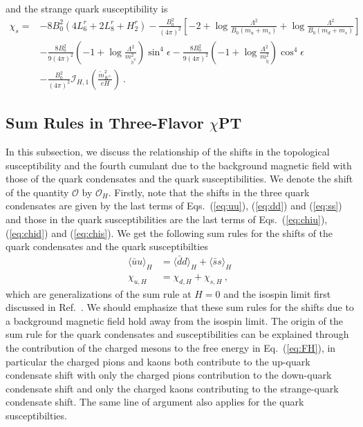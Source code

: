 \documentclass[12pt]{elsarticle}
\begin{document}
and the strange quark susceptibility is
\begin{equation}
\begin{split}
\label{eq:chis}
\chi_{s}=&-8B_{0}^{2}(4L^{r}_{6}+2L^{r}_{8}+H^{r}_{2})-\frac{B_{0}^{2}}{(4\pi)^{2}}\left[-2+\log\frac{\Lambda^{2}}{B_{0}(m_{u}+m_{s})}+\log\frac{\Lambda^{2}}{B_{0}(m_{d}+m_{s})}\right]\\
&-\frac{8B_{0}^{2}}{9(4\pi)^{2}}\left(-1+\log\frac{\Lambda^{2}}{m_{\tilde{\pi}^{0}}^{2}}\right)\sin^{4}\epsilon-\frac{8B_{0}^{2}}{9(4\pi)^{2}}\left(-1+\log\frac{\Lambda^{2}}{m_{\tilde{\eta}}^{2}}\right)\cos^{4}\epsilon\\
&-\frac{B_{0}^{2}}{(4\pi)^{2}}\mathcal{I}_{H,1}(\tfrac{\mathring{m}^{2}_{K^{\pm}}}{eH})\ .
\end{split}
\end{equation}
\subsection{Sum Rules in Three-Flavor $\chi$PT}
\label{sec:sumrules}
In this subsection, we discuss the relationship of the shifts in the topological susceptibility and the fourth cumulant due to the background magnetic field with those of the quark condensates and the quark susceptibilities. We denote the shift of the quantity $\mathcal{O}$ by $\mathcal{O}_{H}$. Firstly, note that the shifts in the three quark condensates are given by the last terms of Eqs.~(\ref{eq:uu}), (\ref{eq:dd}) and (\ref{eq:ss}) and those in the quark susceptibilities are the last terms of Eqs.~(\ref{eq:chiu}), (\ref{eq:chid}) and (\ref{eq:chis}). We get the following sum rules for the shifts of the quark condensates and the quark susceptibilties
\begin{align}
\label{eq:sumrule-qq}
\langle\bar{u}u\rangle_{H}&=\langle\bar{d}d\rangle_{H}+\langle\bar{s}s\rangle_{H}\\
\label{eq:sumrule-chiq}
\chi_{u,H}&=\chi_{d,H}+\chi_{s,H}\ ,
\end{align}
which are generalizations of the sum rule at $H=0$ and the isospin limit first discussed in Ref.~\cite{Gasser:1984gg}. We should emphasize that these sum rules for the shifts due to a background magnetic field hold away from the isospin limit. The origin of the sum rule for the quark condensates and susceptibilities can be explained through the contribution of the charged mesons to the free energy in Eq.~(\ref{eq:FH}), in particular the charged pions and kaons both contribute to the up-quark condensate shift with only the charged pions contribution to the down-quark condensate shift and only the charged kaons contributing to the strange-quark condensate shift. The same line of argument also applies for the quark susceptibilties.
\end{document}
